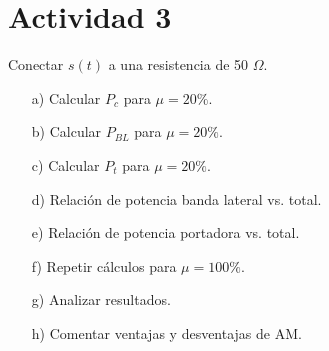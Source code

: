 \section{Actividad 3}

Conectar $s(t)$ a una resistencia de 50 $\Omega$.  

\begin{itemize}
    \item[a)] Calcular $P_c$ para $\mu=20\%$.  
    \item[b)] Calcular $P_{BL}$ para $\mu=20\%$.  
    \item[c)] Calcular $P_t$ para $\mu=20\%$.  
    \item[d)] Relación de potencia banda lateral vs. total.  
    \item[e)] Relación de potencia portadora vs. total.  
    \item[f)] Repetir cálculos para $\mu=100\%$.  
    \item[g)] Analizar resultados.  
    \item[h)] Comentar ventajas y desventajas de AM.  
\end{itemize}